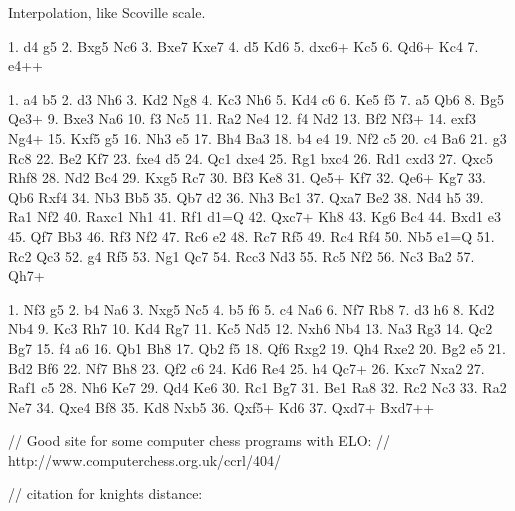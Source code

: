 \documentclass[numbers]{sigplanconf}
\begin{document}
Interpolation, like Scoville scale.

1. d4 g5 2. Bxg5 Nc6 3. Bxe7 Kxe7 4. d5 Kd6
5. dxc6+ Kc5 6. Qd6+ Kc4 7. e4++

1. a4 b5 2. d3 Nh6 3. Kd2 Ng8 4. Kc3 Nh6
5. Kd4 c6 6. Ke5 f5 7. a5 Qb6 8. Bg5 Qe3+
9. Bxe3 Na6 10. f3 Nc5 11. Ra2 Ne4 12. f4 Nd2
13. Bf2 Nf3+ 14. exf3 Ng4+ 15. Kxf5 g5 16. Nh3 e5
17. Bh4 Ba3 18. b4 e4 19. Nf2 c5 20. c4 Ba6
21. g3 Rc8 22. Be2 Kf7 23. fxe4 d5 24. Qc1 dxe4
25. Rg1 bxc4 26. Rd1 cxd3 27. Qxc5 Rhf8 28. Nd2 Bc4
29. Kxg5 Rc7 30. Bf3 Ke8 31. Qe5+ Kf7 32. Qe6+ Kg7
33. Qb6 Rxf4 34. Nb3 Bb5 35. Qb7 d2 36. Nh3 Bc1
37. Qxa7 Be2 38. Nd4 h5 39. Ra1 Nf2 40. Raxc1 Nh1
41. Rf1 d1=Q 42. Qxc7+ Kh8 43. Kg6 Bc4 44. Bxd1 e3
45. Qf7 Bb3 46. Rf3 Nf2 47. Rc6 e2 48. Rc7 Rf5
49. Rc4 Rf4 50. Nb5 e1=Q 51. Rc2 Qc3 52. g4 Rf5
53. Ng1 Qc7 54. Rcc3 Nd3 55. Rc5 Nf2 56. Nc3 Ba2
57. Qh7+

1. Nf3 g5 2. b4 Na6 3. Nxg5 Nc5 4. b5 f6
5. c4 Na6 6. Nf7 Rb8 7. d3 h6 8. Kd2 Nb4
9. Kc3 Rh7 10. Kd4 Rg7 11. Kc5 Nd5 12. Nxh6 Nb4
13. Na3 Rg3 14. Qc2 Bg7 15. f4 a6 16. Qb1 Bh8
17. Qb2 f5 18. Qf6 Rxg2 19. Qh4 Rxe2 20. Bg2 e5
21. Bd2 Bf6 22. Nf7 Bh8 23. Qf2 c6 24. Kd6 Re4
25. h4 Qc7+ 26. Kxc7 Nxa2 27. Raf1 c5 28. Nh6 Ke7
29. Qd4 Ke6 30. Rc1 Bg7 31. Be1 Ra8 32. Rc2 Nc3
33. Ra2 Ne7 34. Qxe4 Bf8 35. Kd8 Nxb5 36. Qxf5+ Kd6
37. Qxd7+ Bxd7++







// Good site for some computer chess programs with ELO:
// http://www.computerchess.org.uk/ccrl/404/


\nocite{elo1978rating}
\nocite{topple}
// citation for knights distance:
\nocite{miller2013counting}

{}

\end{document}
